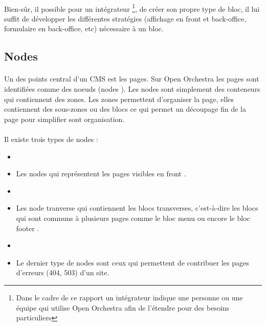 	      \paragraph{}
	      	 Bien-sûr, il possible pour un intégrateur \footnote{Dans le cadre de ce rapport un intégrateur indique une personne ou une équipe qui utilise Open Orchestra afin de  l'étendre pour des besoins particuliers}, de créer son propre type de bloc, il lui suffit de développer les différentes stratégies (affichage en front et back-office, formulaire en back-office, etc) nécessaire à un bloc.  
         \subsection{Nodes}
         \paragraph{}
         Un des points central d'un CMS est les pages. Sur Open Orchestra les pages sont identifiées comme des noeuds (\og nodes \fg{}).
          Les nodes sont simplement des conteneurs qui contiennent des zones. Les zones permettent d'organiser la page, elles contiennent des sous-zones ou des blocs ce qui permet un découpage fin de la page pour simplifier sont organisation. 
         \paragraph{}
         Il existe trois types de nodes : 
         \begin{itemize}
         \item[]
         \item  Les nodes qui représentent les pages visibles en \og front \fg{}.
          \item[]
         \item  Les \og node tranverse \fg{} qui contiennent les blocs transverses, c'est-à-dire les blocs qui sont communs à plusieurs pages comme le bloc \og menu \fg{} ou encore le bloc \og footer \fg{}.
          \item[]
         \item Le dernier type de nodes sont ceux qui permettent de contribuer les pages d'erreurs (404, 503) d'un site.
         \end{itemize}
